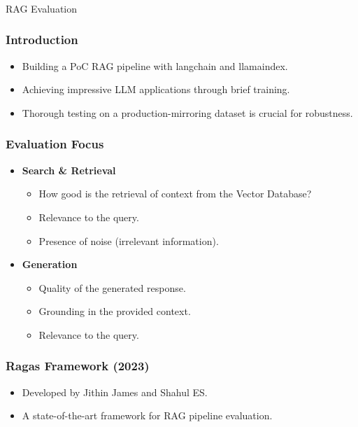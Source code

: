 \begin{frame}[fragile]\frametitle{}
\begin{center}
{\Large RAG Evaluation}
\end{center}
\end{frame}

\begin{frame}[fragile]
\frametitle{Introduction}
\begin{itemize}
    \item Building a PoC RAG pipeline with langchain and llamaindex.
    \item Achieving impressive LLM applications through brief training.
    \item Thorough testing on a production-mirroring dataset is crucial for robustness.
\end{itemize}
\end{frame}

\begin{frame}[fragile]
\frametitle{Evaluation Focus}
\begin{itemize}
    \item \textbf{Search \& Retrieval}
    \begin{itemize}
        \item How good is the retrieval of context from the Vector Database?
        \item Relevance to the query.
        \item Presence of noise (irrelevant information).
    \end{itemize}
    \item \textbf{Generation}
    \begin{itemize}
        \item Quality of the generated response.
        \item Grounding in the provided context.
        \item Relevance to the query.
    \end{itemize}
\end{itemize}
\end{frame}

\begin{frame}[fragile]
\frametitle{Ragas Framework (2023)}
\begin{itemize}
    \item Developed by Jithin James and Shahul ES.
    \item A state-of-the-art framework for RAG pipeline evaluation.
\end{itemize}
\end{frame}

